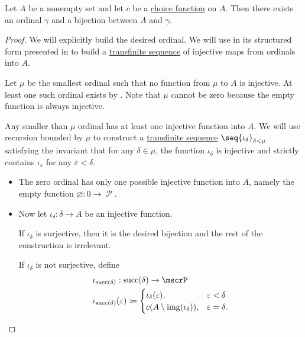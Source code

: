 \begin{lemma}\label{thm:ordinal_bijection_and_choice}
  Let \( A \) be a nonempty set and let \( c \) be a \hyperref[def:choice_function]{choice function} on \( A \). Then there exists an ordinal \( \gamma \) and a bijection between \( A \) and \( \gamma \).
\end{lemma}
\begin{proof}
  We will explicitly build the desired ordinal. We will use  in its structured form presented in  to build a \hyperref[def:transfinite_sequence]{transfinite sequence} of injective maps from ordinals into \( A \).

  Let \( \mu \) be the smallest ordinal such that no function from \( \mu \) to \( A \) is injective. At least one such ordinal exists by . Note that \( \mu \) cannot be zero because the empty function is always injective.

  Any smaller than \( \mu \) ordinal has at least one injective function into \( A \). We will use recursion bounded by \( \mu \) to construct a \hyperref[def:transfinite_sequence]{transfinite sequence} \( \seq{ \iota_\delta }_{\delta < \mu} \) satisfying the invariant that for any \( \delta \in \mu \), the function \( \iota_\delta \) is injective and strictly contains \( \iota_\varepsilon \) for any \( \varepsilon < \delta \).

  \begin{itemize}
    \item The zero ordinal has only one possible injective function into \( A \), namely the empty function \( \varnothing: 0 \to \mscrP \).

    \item Now let \( \iota_\delta: \delta \to A \) be an injective function.

    If \( \iota_\delta \) is surjective, then it is the desired bijection and the rest of the construction is irrelevant.

    If \( \iota_\delta \) is not surjective, define
    \begin{equation*}
      \begin{aligned}
        &\iota_{\op{succ}(\delta)}: \op{succ}(\delta) \to \mscrP \\
        &\iota_{\op{succ}(\delta)}(\varepsilon) \coloneqq \begin{cases}
          \iota_\delta(\varepsilon),         &\varepsilon < \delta \\
          c(A \setminus \img(\iota_\delta)), &\varepsilon = \delta.
        \end{cases}
      \end{aligned}
    \end{equation*}


\end{itemize}
\end{proof}
